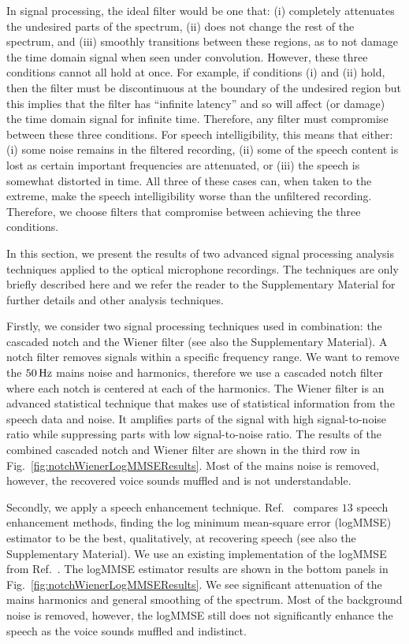 \documentclass[paper-main.tex]{subfiles}
\begin{document}
In signal processing, the ideal filter would be one that:
(i) completely attenuates the undesired parts of the spectrum, 
(ii) does not change the rest of the spectrum, and 
(iii) smoothly transitions between these regions, as to not damage the time domain signal when seen under convolution. 
However, these three conditions cannot all hold at once. 
For example, if conditions (i) and (ii) hold, then the filter must be discontinuous at the boundary of the undesired region but this implies that the filter has ``infinite latency'' and so will affect (or damage) the time domain signal for infinite time.\cite{10.5555/151045}
Therefore, any filter must compromise between these three conditions. 
For speech intelligibility, this means that either: (i) some noise remains in the filtered recording, (ii) some of the speech content is lost as certain important frequencies are attenuated, or (iii) the speech is somewhat distorted in time.
All three of these cases can, when taken to the extreme, make the speech intelligibility worse than the unfiltered recording. 
Therefore, we choose filters that compromise between achieving the three conditions.


In this section, we present the results of two advanced signal processing analysis techniques applied to the optical microphone recordings. 
The techniques are only briefly described here and we refer the reader to the Supplementary Material for further details and other analysis techniques. 



Firstly, we consider two signal processing techniques used in combination: the cascaded notch and the Wiener filter (see also the Supplementary Material). 
A notch filter removes signals within a specific frequency range. 
We want to remove the $50\,{\rm Hz}$ mains noise and harmonics, therefore we use a cascaded notch filter where each notch is centered at each of the harmonics. 
The Wiener filter is an advanced statistical technique that makes use of statistical information from the speech data and noise. 
It amplifies parts of the signal with high signal-to-noise ratio while suppressing parts with low signal-to-noise ratio. 
The results of the combined cascaded notch and Wiener filter are shown in the third row in Fig.~\ref{fig:notchWienerLogMMSEResults}. 
Most of the mains noise is removed, however, the recovered voice sounds muffled and is not understandable. 


Secondly, we apply a speech enhancement technique. 
Ref.~\cite{SubjectiveComparison} compares $13$ speech enhancement methods, finding the log minimum mean-square error (logMMSE) estimator to be the best, qualitatively, at recovering speech (see also the Supplementary Material). 
We use an existing implementation of the logMMSE from Ref.~\cite{logmmse}.  
The logMMSE estimator results are shown in the bottom panels in Fig.~\ref{fig:notchWienerLogMMSEResults}. 
We see significant attenuation of the mains harmonics and general smoothing of the spectrum. 
Most of the background noise is removed, however, the logMMSE still does not significantly enhance the speech as the voice sounds muffled and indistinct.
\end{document}
